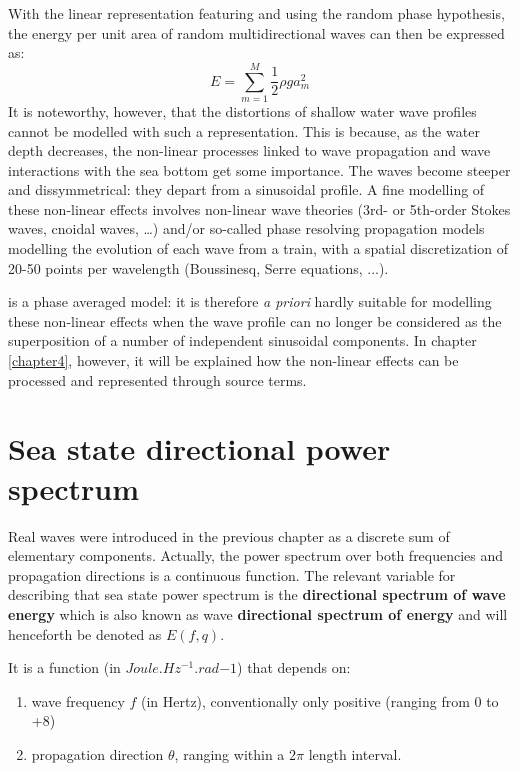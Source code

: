  With the linear representation featuring \tomawac and using the random phase hypothesis, the energy per unit area of random multidirectional waves can then be expressed as:
\begin{equation} \label{GrindEQ__2_5_}
E=\sum _{m=1}^{M}\frac{1}{2} \rho ga_{m}^{2}
\end{equation}
It is noteworthy, however, that the distortions of shallow water wave profiles cannot be modelled with such a representation. This is because, as the water depth decreases, the non-linear processes linked to wave propagation and wave interactions with the sea bottom get some importance. The waves become steeper and dissymmetrical: they depart from a sinusoidal profile. A fine modelling of these non-linear effects involves non-linear wave theories (3rd- or 5th-order Stokes waves, cnoidal waves, \dots ) and/or so-called phase resolving propagation models modelling the evolution of each wave from a train, with a spatial discretization of 20-50 points per wavelength (Boussinesq, Serre equations, ...).

 \tomawac is a phase averaged model: it is therefore \textit{a priori} hardly suitable for modelling these non-linear effects when the wave profile can no longer be considered as the superposition of a number of independent sinusoidal components. In chapter \ref{chapter4}, however, it will be explained how the non-linear effects can be processed and represented through source terms.


\section{ Sea state directional power spectrum}
 Real waves were introduced in the previous chapter as a discrete sum of elementary components. Actually, the power spectrum over both frequencies and propagation directions is a continuous function. The relevant variable for describing that sea state power spectrum is the \textbf{directional spectrum of wave energy} which is also known as wave \textbf{directional spectrum of energy} and will henceforth be denoted as $E(f,q)$.

 It is a function (in $Joule.Hz^{-1}.rad{-1}$) that depends on:

 \begin{enumerate}
\item wave frequency $f$ (in Hertz), conventionally only positive (ranging from 0 to +8)
 \item propagation direction $\theta$, ranging within a $2\pi$ length interval.
\end{enumerate}

